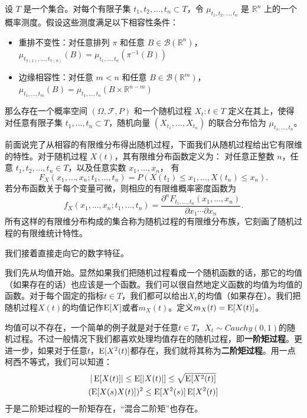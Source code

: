 \begin{theorem}[Kolmogorov扩张定理]
设 $T$ 是一个集合。对每个有限子集 ${t_1, t_2, \dots, t_n} \subset T$，令 $\mu_{t_1, t_2, \dots, t_n}$ 是 $\mathbb{R}^n$ 上的一个概率测度。假设这些测度满足以下相容性条件：
\begin{itemize}
    \item 重排不变性：对任意排列 $\pi$ 和任意 $B \in \mathcal{B}(\mathbb{R}^n)$，$\mu_{t_{\pi(1)}, \ldots,t_{\pi(n)}}(B) = \mu_{t_1,\ldots,t_n}(\pi^{-1}(B))$
    \item 边缘相容性：对任意 $m < n$ 和任意 $B \in \mathcal{B}(\mathbb{R}^m)$，$\mu_{t_1,\ldots,t_m}(B) = \mu_{t_1,\ldots,t_n}(B\times \mathbb{R}^{n-m})$
\end{itemize}

那么存在一个概率空间 $(\Omega, \mathcal{F}, P)$ 和一个随机过程 ${X_t: t \in T}$ 定义在其上，使得对任意有限子集 ${t_1, \dots, t_n} \subset T$，随机向量 $(X_{t_1}, \dots, X_{t_n})$ 的联合分布恰为 $\mu_{t_1, \dots, t_n}$。
\end{theorem}

前面说完了从相容的有限维分布得出随机过程，下面我们从随机过程给出它有限维的特性。对于随机过程 \(X(t)\)，其有限维分布函数定义为：
对任意正整数 \(n\)，任意 \(t_1, t_2, \ldots, t_n \in T\)，以及任意实数 \(x_1, \ldots, x_n\)，
有
\[
F_{X}(x_1,\ldots,x_n;t_1,\ldots,t_n) = P\left( X(t_1) \le x_1, \ldots, X(t_n) \le x_n \right).
\]
若分布函数关于每个变量可微，则相应的有限维概率密度函数为
\[
f_{X}(x_1,\ldots,x_n;t_1,\ldots,t_n) = \frac{\partial^n F_{t_1,\ldots,t_n}(x_1,\ldots,x_n)}{\partial x_1 \cdots \partial x_n}.
\]
所有这样的有限维分布构成的集合称为随机过程的有限维分布族，它刻画了随机过程的有限维统计特性。

我们接着直接走向它的数字特征。

我们先从均值开始。显然如果我们把随机过程看成一个随机函数的话，那它的均值（如果存在的话）也应该是一个函数。我们可以很自然地定义函数的均值为均值的函数。对于每个固定的指标\(t\in T\)，我们都可以给出\(X_t\)的均值（如果存在）。我们把随机过程\(X(t)\)的均值记作\(\operatorname{E}[X]\)或者\(m_X(t)\)。定义\(m_X(t)=\operatorname{E}[X(t)]\)。

均值可以不存在，一个简单的例子就是对于任意\(t\in T\)，\(X_t\sim Cauchy(0,1)\)的随机过程。不过一般情况下我们都喜欢处理均值存在的随机过程，即\textbf{一阶矩过程}。更进一步，如果对于任意\(t\)，\(\operatorname{E}[X^2(t)]\)都存在，我们就将其称为\textbf{二阶矩过程}。用一点柯西不等式，我们可以知道：
\begin{gather*}
|\operatorname{E}[X(t)]| \leq \operatorname{E}[|X(t)|] \leq \sqrt{\operatorname{E}[X^2(t)]}\\
(\operatorname{E}[X(s)X(t)])^2 \leq \operatorname{E}[X^2(s)]\operatorname{E}[X^2(t)]\\
\end{gather*}
于是二阶矩过程的一阶矩存在，“混合二阶矩”也存在。

